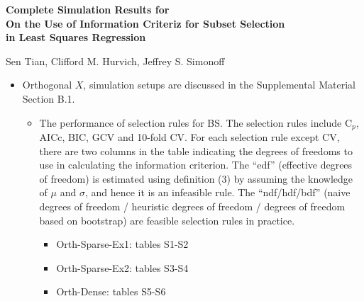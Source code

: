 \documentclass{article}
\newcommand{\beginsupplement}{%
        \setcounter{table}{0}
        \renewcommand{\thetable}{S\arabic{table}}%
        \setcounter{figure}{0}
        \renewcommand{\thefigure}{S\arabic{figure}}%
        \setcounter{page}{0}
        \renewcommand{\theequation}{S.\arabic{equation}}%
        \setcounter{equation}{0}
     }
\begin{document}
\def\spacingset#1{\renewcommand{\baselinestretch}%
{#1}\small\normalsize} \spacingset{1}


\beginsupplement
\appendix
{}
\begin{center}
\textbf{\large Complete Simulation Results for \\
On the Use of Information Criteriz for Subset Selection \\ in Least Squares Regression}

Sen Tian, Clifford M. Hurvich, Jeffrey S. Simonoff
\end{center}

\begin{itemize}
	\item Orthogonal $X$, simulation setups are discussed in the Supplemental Material Section B.1. 
	\begin{itemize}
		\item The performance of selection rules for BS. The selection rules include C$_p$, AICc, BIC, GCV and 10-fold CV. For each selection rule except CV, there are two columns in the table indicating the degrees of freedoms to use in calculating the information criterion. The ``edf'' (effective degrees of freedom) is estimated using definition (3) by assuming the knowledge of $\mu$ and $\sigma$, and hence it is an infeasible rule. The ``ndf/hdf/bdf'' (naive degrees of freedom /  heuristic degrees of freedom / degrees of freedom based on bootstrap) are feasible selection rules in practice. 
		\begin{itemize}
			\item Orth-Sparse-Ex1: tables S1-S2
			\item Orth-Sparse-Ex2: tables S3-S4
			\item Orth-Dense: tables S5-S6
		\end{itemize}


\end{itemize}
\end{itemize}
\end{document}
